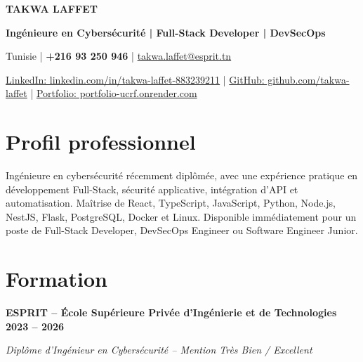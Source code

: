 \documentclass[10pt,a4paper]{article}
\begin{document}

\begin{center}

{\Large \textbf{TAKWA LAFFET}}

\vspace{0pt}

{\small
\textbf{Ingénieure en Cybersécurité | Full-Stack Developer | DevSecOps}
}

\vspace{1pt}

Tunisie \;|\;
\textbf{+216 93 250 946} \;|\;
\href{mailto:takwa.laffet@esprit.tn}{takwa.laffet@esprit.tn}

\vspace{1pt}

\href{https://www.linkedin.com/in/takwa-laffet-883239211/}
{LinkedIn: linkedin.com/in/takwa-laffet-883239211}
\quad|\quad
\href{https://github.com/takwa-laffet}
{GitHub: github.com/takwa-laffet}
\quad|\quad
\href{https://portfolio-ucrf.onrender.com/}
{Portfolio: portfolio-ucrf.onrender.com}

\end{center}


\section*{Profil professionnel}

Ingénieure en cybersécurité récemment diplômée, avec une expérience pratique
en développement Full-Stack, sécurité applicative, intégration d'API et
automatisation. Maîtrise de React, TypeScript, JavaScript, Python, Node.js,
NestJS, Flask, PostgreSQL, Docker et Linux. Disponible immédiatement pour
un poste de Full-Stack Developer, DevSecOps Engineer ou Software Engineer Junior.

\section*{Formation}

\textbf{ESPRIT -- École Supérieure Privée d'Ingénierie et de Technologies}
\hfill \textbf{2023 -- 2026}

\textit{Diplôme d'Ingénieur en Cybersécurité -- Mention Très Bien / Excellent}
\end{document}
